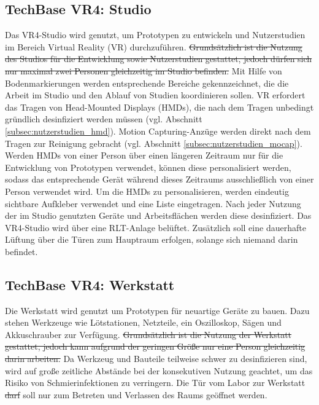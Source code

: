 \subsection{TechBase VR4: Studio}\label{subsec:labore_vr4_stuio}


\noindent
Das VR4-Studio wird genutzt, um Prototypen zu entwickeln und Nutzerstudien im Bereich Virtual Reality (VR) durchzuführen.
\sout{Grundsätzlich ist die Nutzung des Studios für die Entwicklung sowie Nutzerstudien gestattet, jedoch dürfen sich nur maximal zwei Personen gleichzeitig im Studio befinden.}
Mit Hilfe von Bodenmarkierungen werden entsprechende Bereiche gekennzeichnet, die die Arbeit im Studio und den Ablauf von Studien koordinieren sollen.
VR erfordert das Tragen von Head-Mounted Displays (HMDs), die nach dem Tragen unbedingt gründlich desinfiziert werden müssen (vgl. Abschnitt \ref{subsec:nutzerstudien_hmd}).
Motion Capturing-Anzüge werden direkt nach dem Tragen zur Reinigung gebracht (vgl. Abschnitt \ref{subsec:nutzerstudien_mocap}).
Werden HMDs von einer Person über einen längeren Zeitraum nur für die Entwicklung von Prototypen verwendet, können diese personalisiert werden, sodass das entsprechende Gerät während dieses Zeitraums ausschließlich von einer Person verwendet wird.
Um die HMDs zu personalisieren, werden eindeutig sichtbare Aufkleber verwendet und eine Liste eingetragen.
Nach jeder Nutzung der im Studio genutzten Geräte und Arbeitsflächen werden diese desinfiziert.
Das VR4-Studio wird über eine RLT-Anlage belüftet.
Zusätzlich soll eine dauerhafte Lüftung über die Türen zum Hauptraum erfolgen, solange sich niemand darin befindet.

\subsection{TechBase VR4: Werkstatt}\label{subsec:labore_vr4_werkstatt}


\noindent
Die Werkstatt wird genutzt um Prototypen für neuartige Geräte zu bauen.
Dazu stehen Werkzeuge wie Lötstationen, Netzteile, ein Oszilloskop, Sägen und Akkuschrauber zur Verfügung.
\sout{Grundsätzlich ist die Nutzung der Werkstatt gestattet, jedoch kann aufgrund der geringen Größe nur eine Person gleichzeitig darin arbeiten.}
Da Werkzeug und Bauteile teilweise schwer zu desinfizieren sind, wird auf große zeitliche Abstände bei der konsekutiven Nutzung geachtet, um das Risiko von Schmierinfektionen zu verringern.
Die Tür vom Labor zur Werkstatt \sout{darf} soll nur zum Betreten und Verlassen des Raums geöffnet werden.

